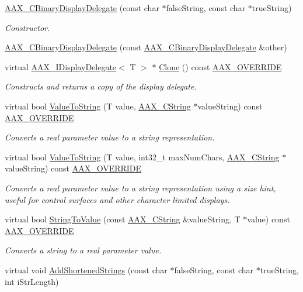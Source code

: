 \begin{DoxyCompactItemize}
\item 
\hyperlink{a00012_a7261174f82f961b2573bfbf334ed064c}{A\+A\+X\+\_\+\+C\+Binary\+Display\+Delegate} (const char $\ast$false\+String, const char $\ast$true\+String)
\begin{DoxyCompactList}\small\item\em Constructor. \end{DoxyCompactList}\item 
\hyperlink{a00012_a5b7d4d97d370445390d5d79218d868d9}{A\+A\+X\+\_\+\+C\+Binary\+Display\+Delegate} (const \hyperlink{a00012}{A\+A\+X\+\_\+\+C\+Binary\+Display\+Delegate} \&other)
\item 
virtual \hyperlink{a00092}{A\+A\+X\+\_\+\+I\+Display\+Delegate}$<$ T $>$ $\ast$ \hyperlink{a00012_ac0f060429501b13e2f79babbcfdda9ab}{Clone} () const \hyperlink{a00149_ac2f24a5172689ae684344abdcce55463}{A\+A\+X\+\_\+\+O\+V\+E\+R\+R\+I\+D\+E}
\begin{DoxyCompactList}\small\item\em Constructs and returns a copy of the display delegate. \end{DoxyCompactList}\item 
virtual bool \hyperlink{a00012_a37fc0647f758a9ff0d47595ba110ecdd}{Value\+To\+String} (T value, \hyperlink{a00042}{A\+A\+X\+\_\+\+C\+String} $\ast$value\+String) const \hyperlink{a00149_ac2f24a5172689ae684344abdcce55463}{A\+A\+X\+\_\+\+O\+V\+E\+R\+R\+I\+D\+E}
\begin{DoxyCompactList}\small\item\em Converts a real parameter value to a string representation. \end{DoxyCompactList}\item 
virtual bool \hyperlink{a00012_ad499fa03159aec7df8da1be67aae82c7}{Value\+To\+String} (T value, int32\+\_\+t max\+Num\+Chars, \hyperlink{a00042}{A\+A\+X\+\_\+\+C\+String} $\ast$value\+String) const \hyperlink{a00149_ac2f24a5172689ae684344abdcce55463}{A\+A\+X\+\_\+\+O\+V\+E\+R\+R\+I\+D\+E}
\begin{DoxyCompactList}\small\item\em Converts a real parameter value to a string representation using a size hint, useful for control surfaces and other character limited displays. \end{DoxyCompactList}\item 
virtual bool \hyperlink{a00012_ac707b7ca0e5fafdc4133959d8b7c5035}{String\+To\+Value} (const \hyperlink{a00042}{A\+A\+X\+\_\+\+C\+String} \&value\+String, T $\ast$value) const \hyperlink{a00149_ac2f24a5172689ae684344abdcce55463}{A\+A\+X\+\_\+\+O\+V\+E\+R\+R\+I\+D\+E}
\begin{DoxyCompactList}\small\item\em Converts a string to a real parameter value. \end{DoxyCompactList}\item 
virtual void \hyperlink{a00012_a3e6702d7c53a7f0a0f29ecf1ecd4b9b7}{Add\+Shortened\+Strings} (const char $\ast$false\+String, const char $\ast$true\+String, int i\+Str\+Length)
\end{DoxyCompactItemize}


